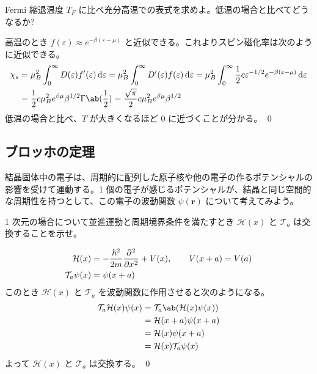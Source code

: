 \documentclass[uplatex,dvipdfmx,a4paper,11pt]{jlreq}
\makeatletter
\newcommand{\rr}{\bm{r}}
\numberwithin{equation}{section}
\theoremstyle{definition}
\renewenvironment{proof}[1][\proofname]{\par
  \normalfont
  \topsep6\p@\@plus6\p@ \trivlist
  \item[\hskip\labelsep{\bfseries #1}\@addpunct{\bfseries}]\ignorespaces\quad\par
}{%
  \qed\endtrivlist\@endpefalse
}
\renewcommand\proofname{証明}
\makeatother
\begin{document}
\begin{problem}
Fermi 縮退温度 $T_F$ に比べ充分高温での表式を求めよ。低温の場合と比べてどうなるか?
\end{problem}
\begin{proof}
  高温のとき $f(\varepsilon) \approx e^{-\beta(\varepsilon - \mu)}$ と近似できる。これよりスピン磁化率は次のように近似できる。
  \begin{align}
    \chi_s & = \mu_B^2\int_{0}^{\infty}D(\varepsilon)f'(\varepsilon)\dl{\varepsilon} = \mu_B^2\int_{0}^{\infty}D'(\varepsilon)f(\varepsilon)\dl{\varepsilon} = \mu_B^2\int_{0}^{\infty}\frac{1}{2}c\varepsilon^{-1/2}e^{-\beta(\varepsilon - \mu)}\dl{\varepsilon} \\
           & = \frac{1}{2}c\mu_B^2e^{\beta\mu}\beta^{1/2}\Gamma\ab(\frac{1}{2}) = \frac{\sqrt{\pi}}{2}c\mu_B^2e^{\beta\mu}\beta^{1/2}
  \end{align}
  低温の場合と比べ、$T$ が大きくなるほど $0$ に近づくことが分かる。
\end{proof}

\subsection{ブロッホの定理}
結晶固体中の電子は、周期的に配列した原子核や他の電子の作るポテンシャルの影響を受けて運動する。1 個の電子が感じるポテンシャルが、結晶と同じ空間的な周期性を持つとして、この電子の波動関数 $\psi(\rr)$ について考えてみよう。
\begin{problem}
1 次元の場合について並進運動と周期境界条件を満たすとき $\mathcal{H}(x)$ と $\mathcal{T}_a$ は交換することを示せ。
\end{problem}
\begin{proof}
  \begin{align}
    \mathcal{H}(x)       & = -\frac{\hbar^2}{2m}\diffp[2]{}{x} + V(x), \qquad V(x + a) = V(a) \\
    \mathcal{T}_a\psi(x) & = \psi(x + a)
  \end{align}
  このとき $\mathcal{H}(x)$ と $\mathcal{T}_a$ を波動関数に作用させると次のようになる。
  \begin{align}
    \mathcal{T}_a\mathcal{H}(x)\psi(x) & = \mathcal{T}_a\ab(\mathcal{H}(x)\psi(x)) \\
                                       & = \mathcal{H}(x + a)\psi(x + a)           \\
                                       & = \mathcal{H}(x)\psi(x + a)               \\
                                       & = \mathcal{H}(x)\mathcal{T}_a\psi(x)
  \end{align}
  よって $\mathcal{H}(x)$ と $\mathcal{T}_a$ は交換する。
\end{proof}
\end{document}
